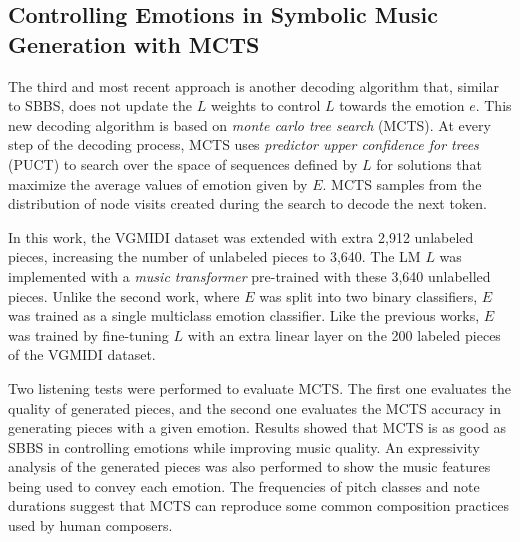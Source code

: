 \subsection{Controlling Emotions in Symbolic Music Generation with MCTS}


The third and most recent approach is another decoding algorithm that, similar to SBBS, does not update the $L$ weights to control $L$ towards the emotion $e$. This new decoding algorithm is based on \textit{monte carlo tree search} (MCTS). At every step of the decoding process, MCTS uses \textit{predictor upper confidence for trees} (PUCT) to search over the space of sequences defined by $L$ for solutions that maximize the average values of emotion given by $E$. MCTS samples from the distribution of node visits created during the search to decode the next token.

In this work, the VGMIDI dataset was extended with extra 2,912 unlabeled pieces, increasing the number of unlabeled pieces to 3,640. The LM $L$ was implemented with a \textit{music transformer} \cite{huang2018music} pre-trained with these 3,640 unlabelled pieces. Unlike the second work, where $E$ was split into two binary classifiers, $E$ was trained as a single multiclass emotion classifier. Like the previous works, $E$ was trained by fine-tuning $L$ with an extra linear layer on the 200 labeled pieces of the VGMIDI dataset.

Two listening tests were performed to evaluate MCTS. The first one evaluates the quality of generated pieces, and the second one evaluates the MCTS accuracy in generating pieces with a given emotion. Results showed that MCTS is as good as SBBS in controlling emotions while improving music quality. An expressivity analysis of the generated pieces was also performed to show the music features being used to convey each emotion. The frequencies of pitch classes and note durations suggest that MCTS can reproduce some common composition practices used by human composers.


